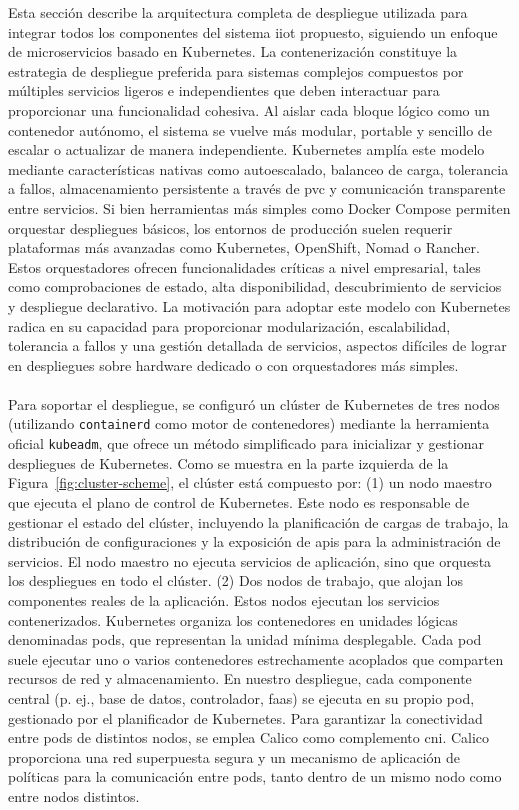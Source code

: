 Esta sección describe la arquitectura completa de despliegue utilizada para integrar todos los componentes del sistema \gls{iiot} propuesto, siguiendo un enfoque de microservicios basado en Kubernetes. La contenerización constituye la estrategia de despliegue preferida para sistemas complejos compuestos por múltiples servicios ligeros e independientes que deben interactuar para proporcionar una funcionalidad cohesiva. Al aislar cada bloque lógico como un contenedor autónomo, el sistema se vuelve más modular, portable y sencillo de escalar o actualizar de manera independiente. Kubernetes amplía este modelo mediante características nativas como autoescalado, balanceo de carga, tolerancia a fallos, almacenamiento persistente a través de \gls{pvc} y comunicación transparente entre servicios. Si bien herramientas más simples como Docker Compose permiten orquestar despliegues básicos, los entornos de producción suelen requerir plataformas más avanzadas como Kubernetes, OpenShift, Nomad o Rancher. Estos orquestadores ofrecen funcionalidades críticas a nivel empresarial, tales como comprobaciones de estado, alta disponibilidad, descubrimiento de servicios y despliegue declarativo. La motivación para adoptar este modelo con Kubernetes radica en su capacidad para proporcionar modularización, escalabilidad, tolerancia a fallos y una gestión detallada de servicios, aspectos difíciles de lograr en despliegues sobre hardware dedicado o con orquestadores más simples.\\
\\
Para soportar el despliegue, se configuró un clúster de Kubernetes de tres nodos (utilizando \texttt{containerd} como motor de contenedores) mediante la herramienta oficial \texttt{kubeadm}, que ofrece un método simplificado para inicializar y gestionar despliegues de Kubernetes. Como se muestra en la parte izquierda de la Figura~\ref{fig:cluster-scheme}, el clúster está compuesto por: (1) un nodo maestro que ejecuta el plano de control de Kubernetes. Este nodo es responsable de gestionar el estado del clúster, incluyendo la planificación de cargas de trabajo, la distribución de configuraciones y la exposición de \glspl{api} para la administración de servicios. El nodo maestro no ejecuta servicios de aplicación, sino que orquesta los despliegues en todo el clúster. (2) Dos nodos de trabajo, que alojan los componentes reales de la aplicación. Estos nodos ejecutan los servicios contenerizados. Kubernetes organiza los contenedores en unidades lógicas denominadas pods, que representan la unidad mínima desplegable. Cada pod suele ejecutar uno o varios contenedores estrechamente acoplados que comparten recursos de red y almacenamiento. En nuestro despliegue, cada componente central (p. ej., base de datos, controlador, \gls{faas}) se ejecuta en su propio pod, gestionado por el planificador de Kubernetes. Para garantizar la conectividad entre pods de distintos nodos, se emplea Calico como complemento \gls{cni}. Calico proporciona una red superpuesta segura y un mecanismo de aplicación de políticas para la comunicación entre pods, tanto dentro de un mismo nodo como entre nodos distintos.

